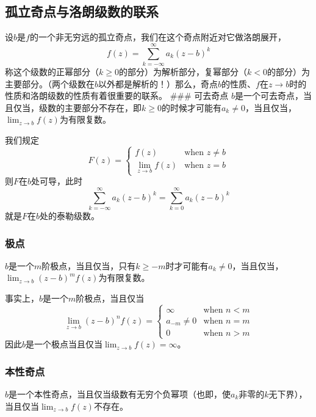 \documentclass[UTF8]{ctexart}
\begin{document}
\hypertarget{ux5b64ux7acbux5947ux70b9ux4e0eux6d1bux6717ux7ea7ux6570ux7684ux8054ux7cfb}{%
\subsection{孤立奇点与洛朗级数的联系}\label{ux5b64ux7acbux5947ux70b9ux4e0eux6d1bux6717ux7ea7ux6570ux7684ux8054ux7cfb}}

设$b$是$f$的一个非无穷远的孤立奇点，我们在这个奇点附近对它做洛朗展开，
\[
f(z) = \sum_{k=-\infty}^\infty a_k (z - b)^k
\]
称这个级数的正幂部分（$k\geq 0$的部分）为解析部分，复幂部分（$k<0$的部分）为主要部分。（两个级数在$b$以外都是解析的！）那么，奇点$b$的性质、$f$在$z\rightarrow b$时的性质和洛朗级数的性质有着很重要的联系。
\#\#\# 可去奇点
$b$是一个可去奇点，当且仅当，级数的主要部分不存在，即$k \geq 0$的时候才可能有$a_k \neq 0$，当且仅当，$\lim_{z\rightarrow b} f(z)$为有限复数。

我们规定 \[
F(z) =
\begin{cases}
    f(z) & \text{when $z \neq b$} \\
    \lim_{z\rightarrow b} f(z) & \text{when $z=b$}
\end{cases}
\] 则$F$在$b$处可导，此时 \[
\sum_{k=-\infty}^\infty a_k (z - b)^k = \sum_{k=0}^\infty a_k (z - b)^k
\] 就是$F$在$b$处的泰勒级数。

\hypertarget{ux6781ux70b9}{%
\subsubsection{极点}\label{ux6781ux70b9}}

$b$是一个$m$阶极点，当且仅当，只有$k \geq -m$时才可能有$a_k \neq 0$，当且仅当，$\lim_{z\rightarrow b}(z-b)^m f(z)$为有限复数。

事实上，$b$是一个$m$阶极点，当且仅当 \[
\lim_{z\rightarrow b} (z-b)^n f(z) = 
\begin{cases}
    \infty & \text{when $n<m$} \\
    a_{-m} \neq 0 & \text{when $n=m$} \\
    0 & \text{when $n>m$}
\end{cases}
\] 因此$b$是一个极点当且仅当$\lim_{z\rightarrow b}f(z) = \infty$。

\hypertarget{ux672cux6027ux5947ux70b9}{%
\subsubsection{本性奇点}\label{ux672cux6027ux5947ux70b9}}

$b$是一个本性奇点，当且仅当级数有无穷个负幂项（也即，使$a_k$非零的$k$无下界），当且仅当$\lim_{z\rightarrow b} f(z)$不存在。
\end{document}
